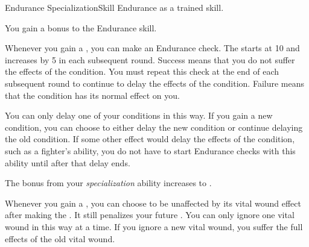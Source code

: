   \begin{feat}{Endurance Specialization}{Skill}
    \featpre Endurance as a trained skill.

     You gain a  bonus to the Endurance skill.

     Whenever you gain a , you can make an Endurance check.
    The  starts at 10 and increases by 5 in each subsequent round.
    Success means that you do not suffer the effects of the condition.
    You must repeat this check at the end of each subsequent round to continue to delay the effects of the condition.
    Failure means that the condition has its normal effect on you.

    You can only delay one of your conditions in this way.
    If you gain a new condition, you can choose to either delay the new condition or continue delaying the old condition.
    If some other effect would delay the effects of the condition, such as a fighter's  ability, you do not have to start Endurance checks with this ability until after that delay ends.

     The bonus from your \textit{specialization} ability increases to .

     Whenever you gain a , you can choose to be unaffected by its vital wound effect after making the .
    It still penalizes your future .
    You can only ignore one vital wound in this way at a time.
    If you ignore a new vital wound, you suffer the full effects of the old vital wound.
  \end{feat}


